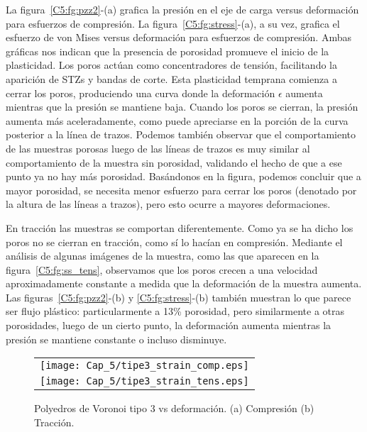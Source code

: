 La figura~\ref{C5:fg:pzz2}-(a) grafica la presión en el eje de carga versus deformación para esfuerzos de compresión. La figura~\ref{C5:fg:stress}-(a),
a su vez, grafica el esfuerzo de von Mises versus deformación para esfuerzos de compresión.
Ambas gráficas nos indican que la presencia de porosidad promueve el inicio de la plasticidad. Los poros actúan como concentradores de tensión,
facilitando la aparición de STZs y bandas de corte. Esta plasticidad temprana comienza a
cerrar los poros, produciendo una curva donde la deformación $\epsilon$ aumenta mientras que la presión se mantiene baja.
Cuando los poros se cierran, la presión aumenta más aceleradamente, como puede apreciarse en la porción de la curva posterior
a la línea de trazos. Podemos también observar que el comportamiento de las muestras porosas luego de las líneas de trazos es
muy similar al comportamiento de la muestra sin porosidad, validando el hecho de que a ese punto ya no hay más porosidad. Basándonos en la figura,
podemos concluir que a mayor porosidad, se necesita menor esfuerzo para cerrar los poros (denotado por la altura de las líneas a trazos),
pero esto ocurre a mayores deformaciones.

En tracción las muestras se comportan diferentemente. Como ya se ha dicho los poros no se cierran en tracción, como sí lo hacían en compresión.
Mediante el análisis de algunas imágenes de la muestra, como las que aparecen en la figura~\ref{C5:fg:ss_tens},
observamos que los poros crecen a una velocidad aproximadamente constante a medida que la deformación de la muestra aumenta. 
Las figuras~\ref{C5:fg:pzz2}-(b) y \ref{C5:fg:stress}-(b) también muestran lo que parece ser flujo plástico: particularmente a 13\% porosidad,
pero similarmente a otras porosidades, luego de un cierto punto, la deformación aumenta mientras la presión se mantiene constante o
incluso disminuye.

\begin{figure}[h!]
  \centering
  \begin{tabular} {c}
    \texttt{[image: Cap\_5/tipe3\_strain\_comp.eps]}\\
    \texttt{[image: Cap\_5/tipe3\_strain\_tens.eps]}\\
  \end{tabular}
  \caption[Polyedros de Voronoi tipo 3 vs deformación.]{Polyedros de Voronoi tipo 3 vs deformación. (a) Compresión (b) Tracción.}
  \label{C5:fg:tip3}
\end{figure}


